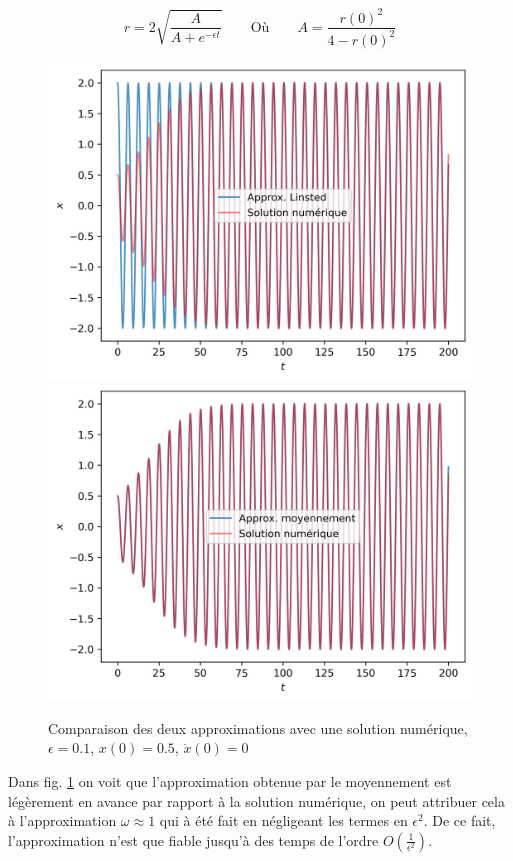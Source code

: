 %
\begin{equation}
    r = 2 \sqrt{ \frac{A}{A + e^{-\epsilon t}} }
    \qquad
    \text{Où}
    \qquad 
    A = \frac{r(0)^2}{4 - r(0)^2}
\end{equation}
%
\begin{figure}
    \centering
    \begin{subcaptionblock}{.90\linewidth}
        \includegraphics[width=.5\linewidth]{images/vdp/vdp_approx_linsted.png}%
        \hfill
        \includegraphics[width=.5\linewidth]{images/vdp/vdp_approx_transient.png}%
    \end{subcaptionblock}
    \caption{Comparaison des deux approximations avec une solution numérique, $\epsilon=0.1$, $x(0)=0.5$, $\dot{x}(0)=0$}
    \label{fig:vdp_approx}
\end{figure}
%
Dans {fig. \ref{fig:vdp_approx}} on voit que l'approximation obtenue par le moyennement est légèrement en avance par rapport à la solution numérique, on peut attribuer cela à l'approximation $\omega \approx 1$ qui à été fait en négligeant les termes en $\epsilon^2$. 
De ce fait, l'approximation n'est que fiable jusqu'à des temps de l'ordre $O\left( \frac{1}{\epsilon^2} \right)$.
